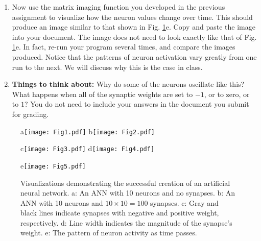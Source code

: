 \documentclass[12pt]{article}
\begin{document}
\begin{enumerate}
\item Now use the matrix imaging function you developed in the previous assignment to visualize how the neuron values change over time. This should produce an image similar to that shown in Fig. \ref{Fig}e. Copy and paste the image into your document. The image does not need to look exactly like that of Fig. \ref{Fig}e. In fact, re-run your program several times, and compare the images produced. Notice that the patterns of neuron activation vary greatly from one run to the next. We will discuss why this is the case in class.

\item \textbf{Things to think about:} Why do some of the neurons oscillate like this? What happens when all of the synaptic weights are set to $-1$, or to zero, or to $1$? You do not need to include your answers in the document you submit for grading.

\end{enumerate}

\begin{figure}[!t]
\centerline{
a\texttt{[image: Fig1.pdf]}
b\texttt{[image: Fig2.pdf]}
}
\centerline{
c\texttt{[image: Fig3.pdf]}
d\texttt{[image: Fig4.pdf]}
}
\centerline{
e\texttt{[image: Fig5.pdf]}
}
\caption{Visualizations demonstrating the successful creation of an artificial neural network.
a: An ANN with 10 neurons and no synapses.
b: An ANN with 10 neurons and $10 \times 10 = 100$ synapses.
c: Gray and black lines indicate synapses with negative and positive weight, respectively.
d: Line width indicates the magnitude of the synapse's weight.
e: The pattern of neuron activity as time passes.}
\label{Fig}
\end{figure}
\end{document}
